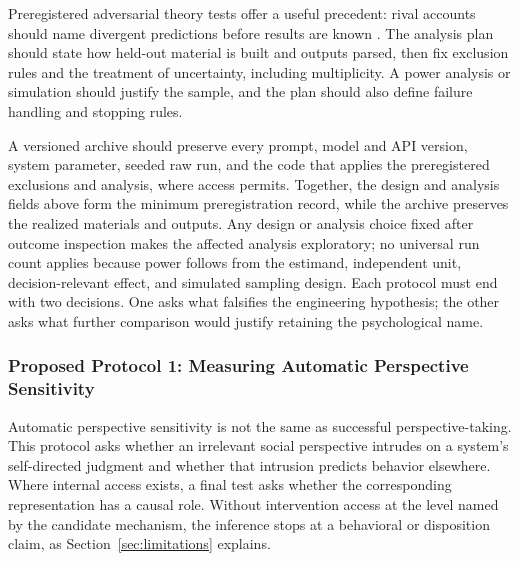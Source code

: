 \documentclass{article}
\begin{document}
Preregistered adversarial theory tests offer a useful precedent: rival accounts should name divergent predictions before results are known \citep{ref69}. The analysis plan should state how held-out material is built and outputs parsed, then fix exclusion rules and the treatment of uncertainty, including multiplicity. A power analysis or simulation should justify the sample, and the plan should also define failure handling and stopping rules.

A versioned archive should preserve every prompt, model and API version, system parameter, seeded raw run, and the code that applies the preregistered exclusions and analysis, where access permits. Together, the design and analysis fields above form the minimum preregistration record, while the archive preserves the realized materials and outputs. Any design or analysis choice fixed after outcome inspection makes the affected analysis exploratory; no universal run count applies because power follows from the estimand, independent unit, decision-relevant effect, and simulated sampling design. Each protocol must end with two decisions. One asks what falsifies the engineering hypothesis; the other asks what further comparison would justify retaining the psychological name.

\subsubsection{Proposed Protocol 1: Measuring Automatic Perspective Sensitivity}
Automatic perspective sensitivity is not the same as successful perspective-taking. This protocol asks whether an irrelevant social perspective intrudes on a system's self-directed judgment and whether that intrusion predicts behavior elsewhere. Where internal access exists, a final test asks whether the corresponding representation has a causal role.
Without intervention access at the level named by the candidate mechanism, the inference stops at a behavioral or disposition claim, as Section~\ref{sec:limitations} explains.
\end{document}
